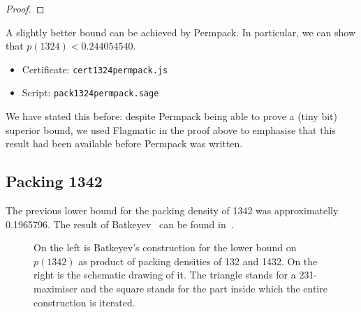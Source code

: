 \documentclass[12pt, a4paper, twoside]{report}
\begin{document}
\begin{proof}

\end{proof}

A slightly better bound can be achieved by Permpack. In particular, we can show that $p(1324)< 0.244054540$.
\begin{itemize}
\item Certificate: \texttt{cert1324permpack.js}
\item Script: \texttt{pack1324permpack.sage}
\end{itemize}
We have stated this before: despite Permpack being able to prove a (tiny bit) superior bound, we used Flagmatic in the proof above to emphasise that this result had been available before Permpack was written. 


\subsection{Packing 1342}
\label{sec:pack1342}

The previous lower bound for the packing density of 1342 was approximatelly 0.1965796. The result of Batkeyev~\cite{batkeyev} can be found in~\cite{albert2002packing}.

\begin{figure}[ht]
\centering \acdbmax
\caption{\small On the left is Batkeyev's construction for the lower bound on $p(1342)$ as product of packing densities of 132 and 1432. On the right is the schematic drawing of it. The triangle stands for a 231-maximiser and the square stands for the part inside which the entire construction is iterated.}
\label{fig:batkeyev}
\end{figure}
\end{document}
